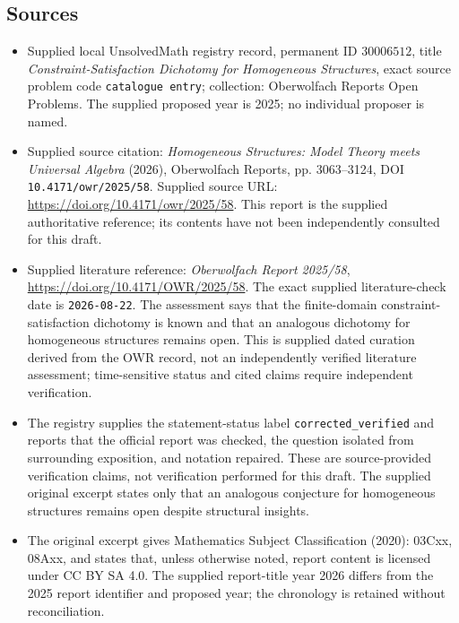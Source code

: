 \documentclass[11pt]{article}
\begin{document}
\subsection{Sources}
\begin{itemize}
\item Supplied local UnsolvedMath registry record, permanent ID \(30006512\), title \emph{Constraint-Satisfaction Dichotomy for Homogeneous Structures}, exact source problem code \texttt{catalogue entry}; collection: Oberwolfach Reports Open Problems. The supplied proposed year is 2025; no individual proposer is named.
\item Supplied source citation: \emph{Homogeneous Structures: Model Theory meets Universal Algebra} (2026), Oberwolfach Reports, pp. 3063--3124, DOI \texttt{10.4171/owr/2025/58}. Supplied source URL: \url{https://doi.org/10.4171/owr/2025/58}. This report is the supplied authoritative reference; its contents have not been independently consulted for this draft.
\item Supplied literature reference: \emph{Oberwolfach Report 2025/58}, \url{https://doi.org/10.4171/OWR/2025/58}. The exact supplied literature-check date is \texttt{2026-08-22}. The assessment says that the finite-domain constraint-satisfaction dichotomy is known and that an analogous dichotomy for homogeneous structures remains open. This is supplied dated curation derived from the OWR record, not an independently verified literature assessment; time-sensitive status and cited claims require independent verification.
\item The registry supplies the statement-status label \texttt{corrected\_verified} and reports that the official report was checked, the question isolated from surrounding exposition, and notation repaired. These are source-provided verification claims, not verification performed for this draft. The supplied original excerpt states only that an analogous conjecture for homogeneous structures remains open despite structural insights.
\item The original excerpt gives Mathematics Subject Classification (2020): 03Cxx, 08Axx, and states that, unless otherwise noted, report content is licensed under CC BY SA 4.0. The supplied report-title year 2026 differs from the 2025 report identifier and proposed year; the chronology is retained without reconciliation.
\end{itemize}
\end{document}
